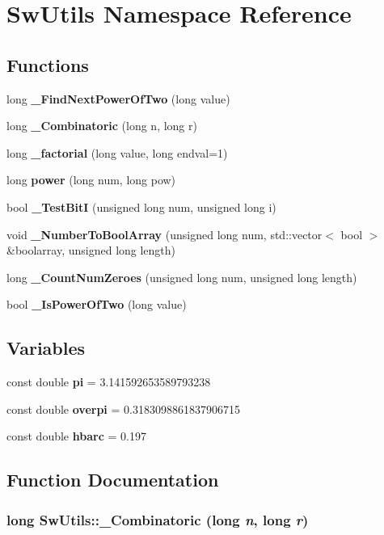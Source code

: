 \section{SwUtils Namespace Reference}
\label{namespaceSwUtils}


\subsection*{Functions}
\begin{CompactItemize}
\item 
long {\bf \_\-FindNextPowerOfTwo} (long value)
\item 
long {\bf \_\-Combinatoric} (long n, long r)
\item 
long {\bf \_\-factorial} (long value, long endval=1)
\item 
long {\bf power} (long num, long pow)
\item 
bool {\bf \_\-TestBitI} (unsigned long num, unsigned long i)
\item 
void {\bf \_\-NumberToBoolArray} (unsigned long num, std::vector$<$ bool $>$ \&boolarray, unsigned long length)
\item 
long {\bf \_\-CountNumZeroes} (unsigned long num, unsigned long length)
\item 
bool {\bf \_\-IsPowerOfTwo} (long value)
\end{CompactItemize}
\subsection*{Variables}
\begin{CompactItemize}
\item 
const double {\bf pi} = 3.141592653589793238
\item 
const double {\bf overpi} = 0.3183098861837906715
\item 
const double {\bf hbarc} = 0.197
\end{CompactItemize}


\subsection{Function Documentation}
\subsubsection{\setlength{\rightskip}{0pt plus 5cm}long SwUtils::\_\-Combinatoric (long {\em n}, long {\em r})}\label{namespaceSwUtils_0183044c7c4da9b92fd4a0d94c5632f3}




